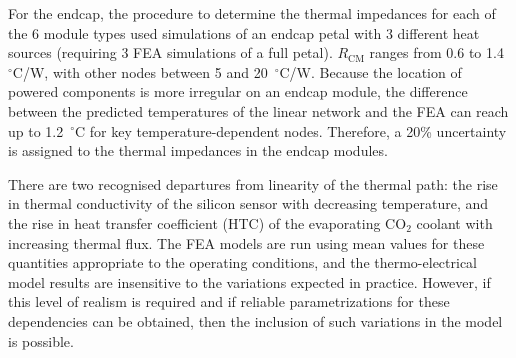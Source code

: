 For the endcap, the procedure to determine the thermal impedances
for each of the 6 module types used simulations of an endcap petal with 3 different heat sources (requiring 3 FEA simulations of a full petal).
$R_\text{CM}$ ranges from 0.6 to 1.4~$^\circ$C/W, with other nodes
between 5 and 20~$^\circ$C/W. Because the location of powered components is more irregular on an
endcap module, the difference between the predicted temperatures of the linear network and the FEA
can reach up to 1.2~$^\circ$C for key temperature-dependent nodes. Therefore, a 20\% uncertainty is assigned
to the thermal impedances in the endcap modules.

There are two recognised departures from linearity of the thermal path: the rise in thermal conductivity of the silicon sensor with decreasing temperature, and the rise in heat transfer coefficient (HTC) of the evaporating CO$_2$ coolant with increasing thermal flux. The FEA models are run using mean values for these quantities appropriate to the operating conditions, and the thermo-electrical model results are insensitive to the variations expected in practice. However, if this level of realism is required and if reliable parametrizations for these dependencies can be obtained, then the inclusion of such variations in the model is possible.
